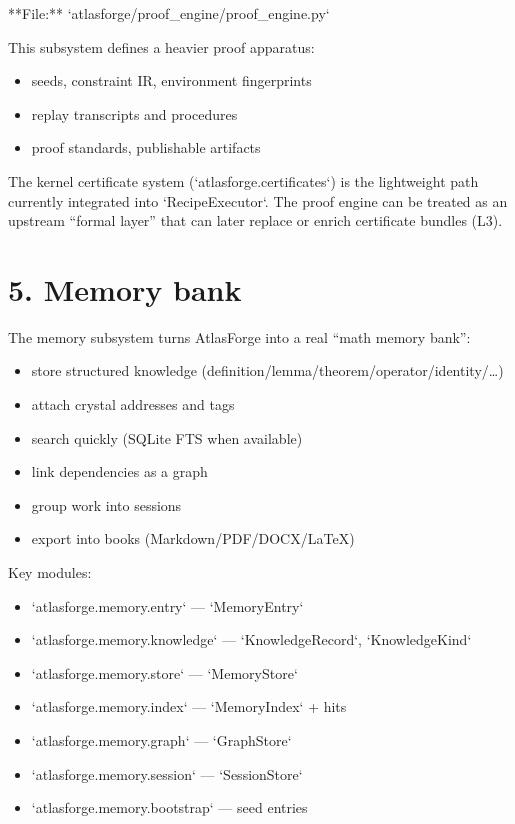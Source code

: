 \documentclass[11pt]{article}
\begin{document}
**File:** `atlasforge/proof\_engine/proof\_engine.py`

This subsystem defines a heavier proof apparatus:
\begin{itemize}
\item seeds, constraint IR, environment fingerprints
\item replay transcripts and procedures
\item proof standards, publishable artifacts
\end{itemize}

The kernel certificate system (`atlasforge.certificates`) is the lightweight path currently integrated into `RecipeExecutor`.  
The proof engine can be treated as an upstream “formal layer” that can later replace or enrich certificate bundles (L3).



\section{5. Memory bank}

The memory subsystem turns AtlasForge into a real “math memory bank”:

\begin{itemize}
\item store structured knowledge (definition/lemma/theorem/operator/identity/…)
\item attach crystal addresses and tags
\item search quickly (SQLite FTS when available)
\item link dependencies as a graph
\item group work into sessions
\item export into books (Markdown/PDF/DOCX/LaTeX)
\end{itemize}

Key modules:

\begin{itemize}
\item `atlasforge.memory.entry` — `MemoryEntry`
\item `atlasforge.memory.knowledge` — `KnowledgeRecord`, `KnowledgeKind`
\item `atlasforge.memory.store` — `MemoryStore`
\item `atlasforge.memory.index` — `MemoryIndex` + hits
\item `atlasforge.memory.graph` — `GraphStore`
\item `atlasforge.memory.session` — `SessionStore`
\item `atlasforge.memory.bootstrap` — seed entries
\end{itemize}
\end{document}
